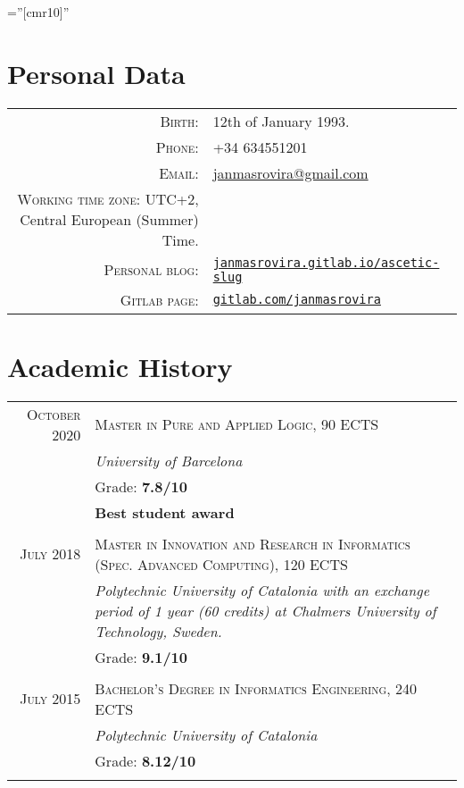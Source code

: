 \documentclass[a4paper,11pt]{article}
\begin{document}
\pagestyle{empty}

\font\fb=''[cmr10]''

\par{\bigskip\par}

\section{Personal Data}

\begin{tabular}{rl}
\textsc{Birth:} & 12th of January 1993.\\
\textsc{Phone:} & +34 634551201\\
\textsc{Email:} & \href{mailto:janmasrovira@gmail.com}{janmasrovira@gmail.com} \\
\textsc{Working time zone:} UTC+2, Central European (Summer) Time.&  \\
\textsc{Personal blog:} & \href{https://janmasrovira.gitlab.io/ascetic-slug/}{\texttt{janmasrovira.gitlab.io/ascetic-slug}} \\
  \textsc{Gitlab page:} & \href{https://gitlab.com/janmasrovira}{\texttt{gitlab.com/janmasrovira}}
\end{tabular}

\section{Academic History}

\begin{tabular}{r|p{11cm}}
  \textsc{October 2020} & \textsc{Master in Pure and Applied Logic, 90 ECTS} \\
 & \emph{University of Barcelona}\\
   & Grade: \textbf{7.8/10} \\
   & \textbf{Best student award} \\
\multicolumn{2}{c}{} \\

  \textsc{July 2018} & \textsc{Master in Innovation and Research in Informatics (Spec. Advanced Computing), 120 ECTS} \\
               & \emph{Polytechnic University of Catalonia with an exchange period of 1 year (60 credits) at Chalmers University of Technology, Sweden.}\\
  & Grade: \textbf{9.1/10} \\
  \multicolumn{2}{c}{} \\

  \textsc{July 2015} & \textsc{Bachelor's Degree in Informatics Engineering, 240 ECTS} \\
               & \emph{Polytechnic University of Catalonia}\\
               & Grade: \textbf{8.12/10} \\
  \multicolumn{2}{c}{} \\
\end{tabular}
\end{document}
